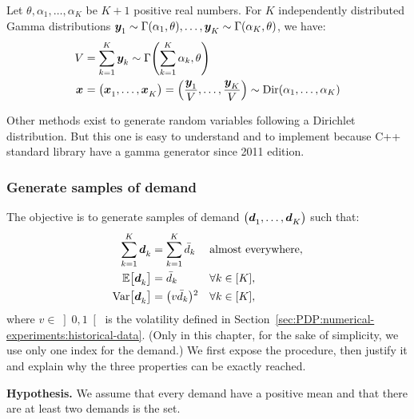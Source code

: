 \begin{prop}\label{prop:dirichlet:generation-from-gamma}
  Let $\theta,\alpha_1,\ldots,\alpha_K$ be $K+1$ positive real numbers.
  For $K$ independently distributed Gamma distributions
  $\va y_1\sim\Gamma\bracket{\alpha_1,\theta},\ldots,\va y_K\sim\Gamma\bracket{\alpha_K,\theta}$,
  we have:
  \begin{subequations}
    \begin{align*}
      V &= \sum_{k=1}^K \va y_k \sim \Gamma\bracket{\sum_{k=1}^K \alpha_k,\theta}
      \\
      \va x &= \bracket{\va x_1,\ldots,\va x_K} = \bracket{\frac{\va y_1}{V},\ldots,\frac{\va y_K}{V}} \sim \Dir\bracket{\alpha_1,\ldots,\alpha_K}
    \end{align*}
  \end{subequations}
\end{prop}

Other methods exist to generate random variables following a Dirichlet distribution. But this one is easy to understand and to implement because C++ standard library have a gamma generator since 2011 edition.




\subsubsection{Generate samples of demand}

The objective is to generate samples of demand $\bracket{\va\demand_1,\ldots,\va\demand_K}$ such that:
\begin{subequations}
  \begin{align}
    \sum_{k=1}^K \va\demand_k &= \sum_{k=1}^K \bar{\demand}_k && \mbox{almost everywhere},
    \\
    \espe\sqbracket{\va\demand_k} &= \bar{\demand}_k && \forall k\in\range{K},
    \\
    \vari\sqbracket{\va\demand_k} &= \bracket{v\bar{\demand}_k}^2 && \forall k\in\range{K},
  \end{align}
\end{subequations}
where $v\in\left]0,1\right[$ is the volatility defined in Section~\ref{sec:PDP:numerical-experiments:historical-data}.
(Only in this chapter, for the sake of simplicity, we use only one index for the demand.)
We first expose the procedure, then justify it and explain why the three properties can be exactly reached.

\medskip

\textbf{Hypothesis.} We assume that every demand have a positive mean and that there are at least two demands is the set.

